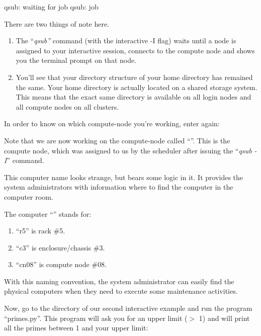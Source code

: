 \begin{prompt}
qsub: waiting for job %
qsub: job %
\end{prompt}

There are two things of note here.

\begin{enumerate}
  \item  The ``\emph{qsub''} command (with the interactive -I
      flag) waits until a node is assigned to your interactive session,
      connects to the compute node and shows you the terminal prompt on that
      node.
  \item  You'll see that your directory structure of your home directory has
      remained the same. Your home directory is actually located on a shared
      storage system. This means that the exact same directory is available
      on all login nodes and all compute nodes on all clusters.
\end{enumerate}

In order to know on which compute-node you're working, enter again:

\begin{prompt}
\end{prompt}

Note that we are now working on the compute-node called ``\emph{\computenode}''.
This is the compute node, which was assigned to us by the scheduler after
issuing the ``\emph{qsub -I}'' command.

\ifantwerpen
This computer name looks strange, but bears some logic in it.  It provides the
system administrators with information where to find the computer in the
computer room.

The computer ``\emph{\computenodeshort}'' stands for:

\begin{enumerate}
\item  ``r5'' is rack \#5.
\item  ``c3'' is enclosure/chassis \#3.
\item  ``cn08'' is compute node \#08.
\end{enumerate}

With this naming convention, the system administrator can easily find the
physical computers when they need to execute some maintenance activities.
\fi

Now, go to the directory of our second interactive example and run the program
``primes.py''. This program will ask you for an upper limit ($>$ 1) and will
print all the primes between 1 and your upper limit:


